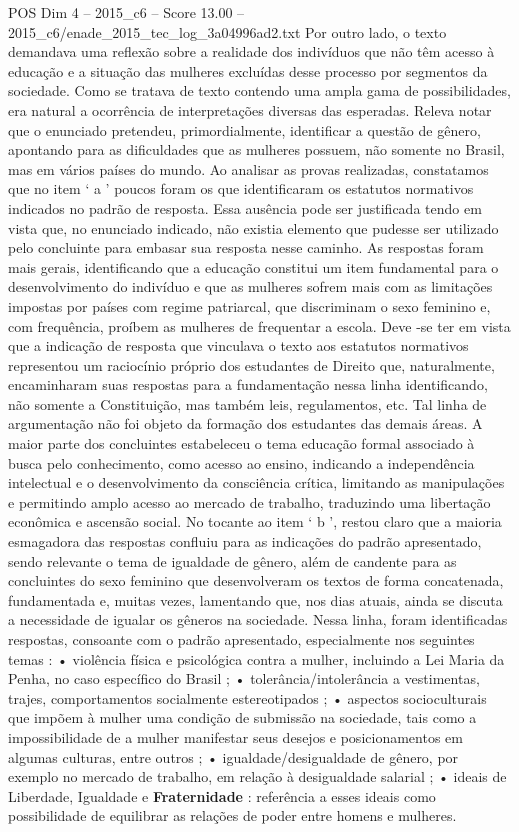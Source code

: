\begin{textsample}{POS Dim 4 – 2015\_c6 – Score 13.00 – 2015\_c6/enade\_2015\_tec\_log\_3a04996ad2.txt}
Por outro lado, o texto demandava uma reflexão sobre a realidade dos indivíduos que não têm acesso à educação e a situação das mulheres excluídas desse processo por segmentos da sociedade.
Como se tratava de texto contendo uma ampla gama de possibilidades, era natural a ocorrência de interpretações diversas das esperadas.
Releva notar que o enunciado pretendeu, primordialmente, identificar a questão de gênero, apontando para as dificuldades que as mulheres possuem, não somente no Brasil, mas em vários países do mundo.
Ao analisar as provas realizadas, constatamos que no item ‘ a ’ poucos foram os que identificaram os estatutos normativos indicados no padrão de resposta.
Essa ausência pode ser justificada tendo em vista que, no enunciado indicado, não existia elemento que pudesse ser utilizado pelo concluinte para embasar sua resposta nesse caminho.
As respostas foram mais gerais, identificando que a educação constitui um item fundamental para o desenvolvimento do indivíduo e que as mulheres sofrem mais com as limitações impostas por países com regime patriarcal, que discriminam o sexo feminino e, com frequência, proíbem as mulheres de frequentar a escola.
Deve -se ter em vista que a indicação de resposta que vinculava o texto aos estatutos normativos representou um raciocínio próprio dos estudantes de Direito que, naturalmente, encaminharam suas respostas para a fundamentação nessa linha identificando, não somente a Constituição, mas também leis, regulamentos, etc.
Tal linha de argumentação não foi objeto da formação dos estudantes das demais áreas.
A maior parte dos concluintes estabeleceu o tema educação formal associado à busca pelo conhecimento, como acesso ao ensino, indicando a independência intelectual e o desenvolvimento da consciência crítica, limitando as manipulações e permitindo amplo acesso ao mercado de trabalho, traduzindo uma libertação econômica e ascensão social.
No tocante ao item ‘ b ’, restou claro que a maioria esmagadora das respostas confluiu para as indicações do padrão apresentado, sendo relevante o tema de igualdade de gênero, além de candente para as concluintes do sexo feminino que desenvolveram os textos de forma concatenada, fundamentada e, muitas vezes, lamentando que, nos dias atuais, ainda se discuta a necessidade de igualar os gêneros na sociedade.
Nessa linha, foram identificadas respostas, consoante com o padrão apresentado, especialmente nos seguintes temas : • violência física e psicológica contra a mulher, incluindo a Lei Maria da Penha, no caso específico do Brasil ; • tolerância/intolerância a vestimentas, trajes, comportamentos socialmente estereotipados ; • aspectos socioculturais que impõem à mulher uma condição de submissão na sociedade, tais como a impossibilidade de a mulher manifestar seus desejos e posicionamentos em algumas culturas, entre outros ; • igualdade/desigualdade de gênero, por exemplo no mercado de trabalho, em relação à desigualdade salarial ; • ideais de Liberdade, Igualdade e \textbf{Fraternidade} : referência a esses ideais como possibilidade de equilibrar as relações de poder entre homens e mulheres.

\end{textsample}
